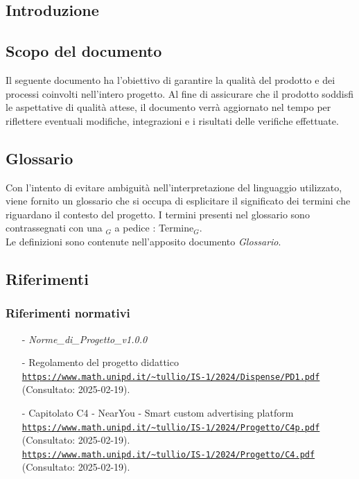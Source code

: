 \documentclass[10pt]{article}
\begin{document}
\newpage
\tableofcontents
\newpage
\listoffigures %
\newpage
\listoftables %
\newpage
\begin{justify}

\section{Introduzione}

\subsection{Scopo del documento}
Il seguente documento ha l'obiettivo di garantire la qualità del prodotto e dei processi coinvolti nell'intero progetto. Al fine di assicurare che il prodotto soddisfi le aspettative di qualità attese, il documento
verrà aggiornato nel tempo per riflettere eventuali modifiche, integrazioni e i risultati delle verifiche effettuate.


\subsection{Glossario}
Con l'intento di evitare ambiguità nell'interpretazione del linguaggio utilizzato, viene fornito un glossario che si occupa di esplicitare il significato dei termini che riguardano il contesto del progetto. I termini presenti nel glossario sono contrassegnati con una $_G$ a pedice : Termine$_G$.\\
Le definizioni sono contenute nell'apposito documento \textit{Glossario}.\\


\subsection{Riferimenti}


\subsubsection{Riferimenti normativi}
\begin{itemize}
    \item[-] \textit{Norme\_di\_Progetto\_v1.0.0}

    \item[-] Regolamento del progetto didattico  \\
      \textcolor{blue}{\texttt{\url{https://www.math.unipd.it/~tullio/IS-1/2024/Dispense/PD1.pdf}}}\\
      (Consultato: 2025-02-19).
    \item[-] Capitolato C4 - NearYou - Smart custom advertising platform\\
    \textcolor{blue}{\texttt{\url{https://www.math.unipd.it/~tullio/IS-1/2024/Progetto/C4p.pdf}}}\\
    (Consultato: 2025-02-19).\\
    \textcolor{blue}{\texttt{\url{https://www.math.unipd.it/~tullio/IS-1/2024/Progetto/C4.pdf}}}\\
    (Consultato: 2025-02-19).
    

\end{itemize}
\end{justify}
\end{document}
